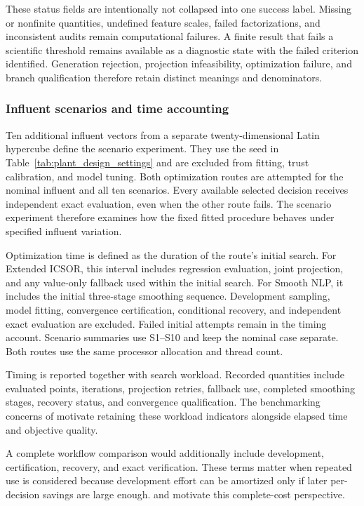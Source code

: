 These status fields are intentionally not collapsed into one success label. Missing or nonfinite quantities, undefined feature scales, failed factorizations, and inconsistent audits remain computational failures. A finite result that fails a scientific threshold remains available as a diagnostic state with the failed criterion identified. Generation rejection, projection infeasibility, optimization failure, and branch qualification therefore retain distinct meanings and denominators.

\subsubsection{Influent scenarios and time accounting}

Ten additional influent vectors from a separate twenty-dimensional Latin hypercube define the scenario experiment. They use the seed in Table~\ref{tab:plant_design_settings} and are excluded from fitting, trust calibration, and model tuning. Both optimization routes are attempted for the nominal influent and all ten scenarios. Every available selected decision receives independent exact evaluation, even when the other route fails. The scenario experiment therefore examines how the fixed fitted procedure behaves under specified influent variation.

Optimization time is defined as the duration of the route's initial search. For Extended ICSOR, this interval includes regression evaluation, joint projection, and any value-only fallback used within the initial search. For Smooth NLP, it includes the initial three-stage smoothing sequence. Development sampling, model fitting, convergence certification, conditional recovery, and independent exact evaluation are excluded. Failed initial attempts remain in the timing account. Scenario summaries use S1--S10 and keep the nominal case separate. Both routes use the same processor allocation and thread count.

Timing is reported together with search workload. Recorded quantities include evaluated points, iterations, projection retries, fallback use, completed smoothing stages, recovery status, and convergence qualification. The benchmarking concerns of \citet{Bliek2023} motivate retaining these workload indicators alongside elapsed time and objective quality.

A complete workflow comparison would additionally include development, certification, recovery, and exact verification. These terms matter when repeated use is considered because development effort can be amortized only if later per-decision savings are large enough. \citet{BhosekarIerapetritou2018} and \citet{Bliek2023} motivate this complete-cost perspective.

